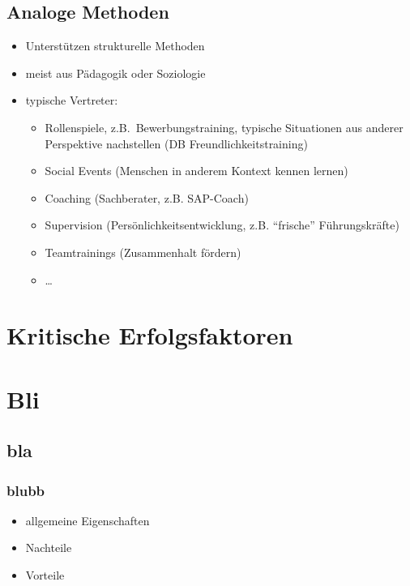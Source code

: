 \documentclass[a4paper, 12pt]{article}
\begin{document}
\subsection{Analoge Methoden}
\begin{itemize}
  \item Unterstützen strukturelle Methoden
  \item meist aus Pädagogik oder Soziologie
  \item typische Vertreter:
    \begin{itemize}
      \item Rollenspiele, z.B.\ Bewerbungstraining, typische Situationen aus anderer Perspektive nachstellen (DB Freundlichkeitstraining)
      \item Social Events (Menschen in anderem Kontext kennen lernen)
      \item Coaching (Sachberater, z.B. SAP-Coach)
      \item Supervision (Persönlichkeitsentwicklung, z.B. ``frische'' Führungskräfte)
      \item Teamtrainings (Zusammenhalt fördern)
      \item \ldots
    \end{itemize}
\end{itemize}



\section{Kritische Erfolgsfaktoren}






\section{Bli}


\subsection{bla}

\subsubsection*{blubb}

\begin{itemize}
  \item allgemeine Eigenschaften
\end{itemize}
\begin{itemize}
  \renewcommand{\labelitemi}{\(-\)}%
  \item Nachteile
\end{itemize}
\begin{itemize}
  \renewcommand{\labelitemi}{+}%
  \item Vorteile
\end{itemize}
\end{document}
